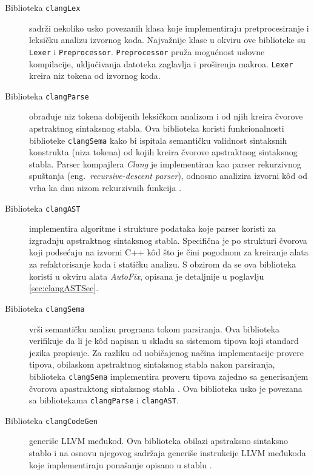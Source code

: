 \documentclass[12pt,oneside]{memoir}
\begin{document}
\begin{description}
  \item[Biblioteka \texttt{clangLex}] sadr\v{z}i nekoliko usko povezanih klasa koje implementiraju pretprocesiranje i leksi\v{c}ku analizu izvornog koda. Najva\v{z}nije klase u okviru ove biblioteke
       su \texttt{Lexer} i  \texttt{Preprocessor}.
       \texttt{Preprocessor} pru\v{z}a mogućnost uslovne kompilacije, uključivanja datoteka zaglavlja i proširenja makroa.
       \texttt{Lexer} kreira niz tokena od izvornog koda.
  \item[Biblioteka \texttt{clangParse}]
        obrađuje niz tokena dobijenih leksi\v{c}kom analizom i od njih kreira \v{c}vorove apstraktnog sintaksnog stabla. Ova biblioteka koristi funkcionalnosti 
        biblioteke \texttt{clangSema} kako bi ispitala semanti\v{c}ku validnost sintaksnih konstrukta (niza tokena) od kojih kreira \v{c}vorove apstraktnog sintaksnog stabla.
        Parser kompajlera \textit{Clang} je implementiran kao parser rekurzivnog spuštanja (eng.~\textit{recursive-descent parser}), odnosno analizira izvorni k\^{o}d od vrha ka dnu nizom rekurzivnih funkcija \cite{LLVMCoreLibraries}.
  \item[Biblioteka \texttt{clangAST}]
        implementira algoritme i strukture podataka koje parser koristi za izgradnju apstraktnog sintaksnog stabla. Specifična je po strukturi čvorova koji podsećaju na izvorni C++ k\^{o}d što je čini pogodnom za kreiranje alata za refaktorisanje koda i statičku analizu. S obzirom da se ova biblioteka koristi u okviru alata \textit{AutoFix}, opisana je detaljnije u poglavlju \ref{sec:clangASTSec}.
  \item[Biblioteka \texttt{clangSema}]
        vrši semantičku analizu programa tokom parsiranja. Ova biblioteka verifikuje da li je k\^{o}d napisan u skladu sa sistemom tipova koji standard jezika propisuje. Za razliku od uobi\v{c}ajenog na\v{c}ina implementacije provere tipova, obilaskom apstraktnog sintaksnog stabla nakon parsiranja, biblioteka \texttt{clangSema} implementira proveru tipova zajedno sa generisanjem \v{c}vorova apastraktong sintaksnog stabla \cite{LLVMCoreLibraries}. Ova biblioteka usko je povezana sa bibliotekama \texttt{clangParse} i \texttt{clangAST}.
  \item[Biblioteka \texttt{clangCodeGen}]
        generiše LLVM međukod. Ova biblioteka obilazi apstraksno sintaksno stablo i na osnovu njegovog sadr\v{z}aja generi\v{s}e instrukcije
        LLVM međukoda koje implementiraju pona\v{s}anje opisano u stablu \cite{LLVMCoreLibraries}.
\end{description}
\end{document}
